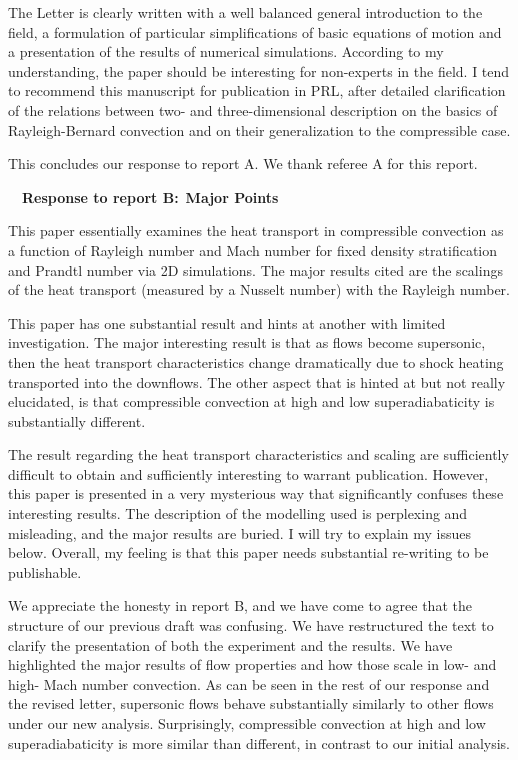 \documentclass[aps, 11pt, singlecolumn]{revtex4-1} %
\begin{document}
\begin{singlespace}
\begin{myquotation}
The Letter is clearly written with a well balanced general
introduction to the field, a formulation of particular simplifications
of basic equations of motion and a presentation of the results of
numerical simulations. According to my understanding, the paper should
be interesting for non-experts in the field. I tend to recommend this
manuscript for publication in PRL, after detailed clarification of the
relations between two- and three-dimensional description on the basics
of Rayleigh-Bernard convection and on their generalization to the
compressible case.
\end{myquotation}
\noindent
This concludes our response to report A.  We thank referee A for this report.




$\,$
\newline
$\,$
\newline
\noindent
\Large{\textbf{Response to report B:}}\newline$\,$\newline\indent
\large{\textbf{Major Points}}

\begin{myquotation}
This paper essentially examines the heat transport in compressible
convection as a function of Rayleigh number and Mach number for fixed
density stratification and Prandtl number via 2D simulations. The major
results cited are the scalings of the heat transport (measured by a
Nusselt number) with the Rayleigh number.

This paper has one substantial result and hints at another with
limited investigation. The major interesting result is that as flows
become supersonic, then the heat transport characteristics change
dramatically due to shock heating transported into the downflows. The
other aspect that is hinted at but not really elucidated, is that
compressible convection at high and low superadiabaticity is
substantially different.

The result regarding the heat transport characteristics and scaling
are sufficiently difficult to obtain and sufficiently interesting to
warrant publication. However, this paper is presented in a very
mysterious way that significantly confuses these interesting results.
The description of the modelling used is perplexing and misleading,
and the major results are buried. I will try to explain my issues
below. Overall, my feeling is that this paper needs substantial
re-writing to be publishable.
\end{myquotation}
We appreciate the honesty in report B, and we have come to agree that the
structure of our previous draft was confusing.  We have restructured the text
to clarify the presentation of both the experiment and the results. 
We have highlighted the major results of flow properties and how those
scale in low- and high- Mach number convection.  As can be seen in
the rest of our response and the revised letter, 
supersonic flows behave substantially similarly to other flows
under our new analysis.  Surprisingly,
compressible convection at high and low superadiabaticity is more similar
than different, in contrast to our initial analysis.


\end{singlespace}
\end{document}
